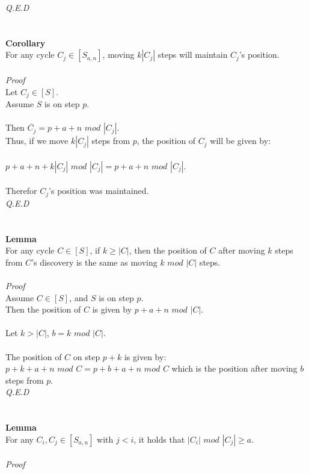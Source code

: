 \documentclass[a4paper,12pt]{article}
\begin{document}
\textit{Q.E.D}\\
\\
\\
\textbf{Corollary}\\
For any cycle $C_j \in [S_{a,n}]$, moving $k|C_j|$ steps will maintain $C_j$'s position.\\
\\
\textit{Proof}\\
Let $C_j \in [S]$.\\
Assume $S$ is on step $p$.\\
\\
Then $\overline{C_j} = p + a + n $ $mod$ $|C_j|$.\\
Thus, if we move $k|C_j|$ steps from $p$, the position of $C_j$ will be given by:\\
\\
$p + a + n + k|C_j|$ $mod$ $|C_j| = p + a + n$ $mod$ $|C_j|$.\\
\\
Therefor $C_j$'s position was maintained.\\
\textit{Q.E.D}\\
\\
\\
\textbf{Lemma}\\
For any cycle $C \in [S]$, if $k \geq |C|$, then the position of $C$ after moving $k$ steps from $C$'s discovery is the same as moving $k$ $mod$ $|C|$ steps.\\
\\
\textit{Proof}\\
Assume $C \in [S]$, and $S$ is on step $p$.\\
Then the position of $C$ is given by $p + a + n$ $mod$ $|C|$.\\
\\
Let $k > |C|$, $b = k$ $mod$ $|C|$.\\
\\
The position of $C$ on step $p + k$ is given by:\\
$p + k + a + n$ $mod$ $C = p + b + a + n$ $mod$ $C$ which is the position after moving $b$ steps from $p$.\\
\textit{Q.E.D}\\
\\
\\
\textbf{Lemma}\\
For any $C_i, C_j \in [S_{a,n}]$ with $j < i$, it holds that $|C_i|$ $mod$ $|C_j| \geq a$.\\
\\
\textit{Proof}\\  
\end{document}
